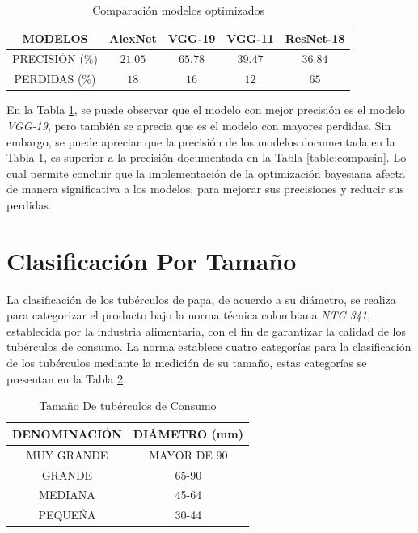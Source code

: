 \begin{table}[ht]
	\centering
	\begin{tabular}{|c|c|c|c|c|}
		\hline
		MODELOS & AlexNet & VGG-19 & VGG-11 & ResNet-18 \\
		\hline
		PRECISIÓN (\%) & $$21.05$$ & $$65.78$$ & $$39.47$$ & $$36.84$$ \\
		\hline
		PERDIDAS (\%) & $$18$$ & $$16$$ & $$12$$ & $$65$$ \\
		\hline
	\end{tabular}	
	\caption{Comparación modelos optimizados}
	\label{table:compacon}
\end{table}	

En la Tabla \ref{table:compacon}, se puede observar que el modelo con mejor precisión es el modelo \textit{VGG-19}, pero también se aprecia que es el modelo con mayores perdidas. Sin embargo, se puede apreciar que la precisión de los modelos documentada en la Tabla \ref{table:compacon}, es superior a la precisión documentada en la Tabla \ref{table:compasin}. Lo cual permite concluir que la implementación de la optimización bayesiana afecta de manera significativa a los modelos, para mejorar sus precisiones y reducir sus perdidas.


\newpage		
\section{Clasificación Por Tamaño}

La clasificación de los tubérculos de papa, de acuerdo a su diámetro, se realiza para categorizar el producto bajo la norma técnica colombiana \textit{NTC 341}, establecida por la industria alimentaria, con el fin de garantizar la calidad de los tubérculos de consumo. 	La norma establece cuatro categorías para la clasificación de los tubérculos mediante la medición de su tamaño, estas categorías se presentan en la Tabla \ref{table:limites}.

\begin{table}[ht]
	\centering
	\begin{tabular}{|c|c|}
		\hline
		DENOMINACIÓN & DIÁMETRO (mm) \\
		\hline
		MUY GRANDE & MAYOR DE 90 \\
		\hline
		GRANDE & 65-90 \\
		\hline
		MEDIANA	& 45-64 \\
		\hline
		PEQUEÑA & 30-44 \\
		\hline
	\end{tabular}	
	\caption{Tamaño De tubérculos de Consumo}
	\label{table:limites}
\end{table}	

